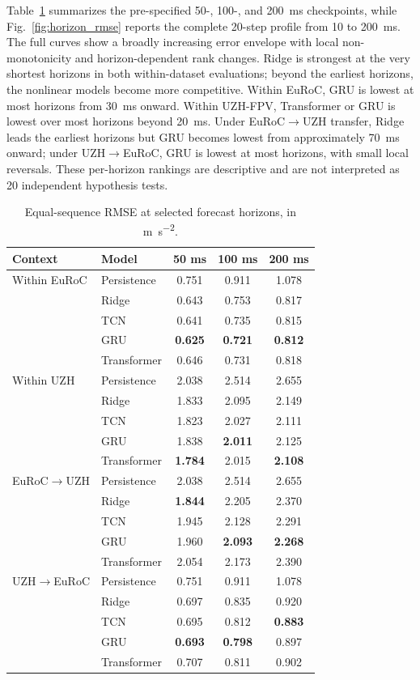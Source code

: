 \documentclass[preprint,12pt]{elsarticle}
\begin{document}
Table~\ref{tab:horizon_results} summarizes the pre-specified 50-, 100-, and \SI{200}{\milli\second} checkpoints, while Fig.~\ref{fig:horizon_rmse} reports the complete 20-step profile from 10 to \SI{200}{\milli\second}. The full curves show a broadly increasing error envelope with local non-monotonicity and horizon-dependent rank changes. Ridge is strongest at the very shortest horizons in both within-dataset evaluations; beyond the earliest horizons, the nonlinear models become more competitive. Within EuRoC, GRU is lowest at most horizons from 30~ms onward. Within UZH-FPV, Transformer or GRU is lowest over most horizons beyond 20~ms. Under EuRoC$\rightarrow$UZH transfer, Ridge leads the earliest horizons but GRU becomes lowest from approximately 70~ms onward; under UZH$\rightarrow$EuRoC, GRU is lowest at most horizons, with small local reversals. These per-horizon rankings are descriptive and are not interpreted as 20 independent hypothesis tests.

\begin{table}[t]
\centering
\caption{Equal-sequence RMSE at selected forecast horizons, in \si{\metre\per\second\squared}.}
\label{tab:horizon_results}
\small
\begin{tabular}{llccc}
\toprule
Context & Model & 50 ms & 100 ms & 200 ms \\
\midrule
Within EuRoC & Persistence & 0.751 & 0.911 & 1.078 \\
 & Ridge & 0.643 & 0.753 & 0.817 \\
 & TCN & 0.641 & 0.735 & 0.815 \\
 & GRU & \textbf{0.625} & \textbf{0.721} & \textbf{0.812} \\
 & Transformer & 0.646 & 0.731 & 0.818 \\
\addlinespace
Within UZH & Persistence & 2.038 & 2.514 & 2.655 \\
 & Ridge & 1.833 & 2.095 & 2.149 \\
 & TCN & 1.823 & 2.027 & 2.111 \\
 & GRU & 1.838 & \textbf{2.011} & 2.125 \\
 & Transformer & \textbf{1.784} & 2.015 & \textbf{2.108} \\
\addlinespace
EuRoC$\rightarrow$UZH & Persistence & 2.038 & 2.514 & 2.655 \\
 & Ridge & \textbf{1.844} & 2.205 & 2.370 \\
 & TCN & 1.945 & 2.128 & 2.291 \\
 & GRU & 1.960 & \textbf{2.093} & \textbf{2.268} \\
 & Transformer & 2.054 & 2.173 & 2.390 \\
\addlinespace
UZH$\rightarrow$EuRoC & Persistence & 0.751 & 0.911 & 1.078 \\
 & Ridge & 0.697 & 0.835 & 0.920 \\
 & TCN & 0.695 & 0.812 & \textbf{0.883} \\
 & GRU & \textbf{0.693} & \textbf{0.798} & 0.897 \\
 & Transformer & 0.707 & 0.811 & 0.902 \\
\bottomrule
\end{tabular}
\end{table}
\end{document}
